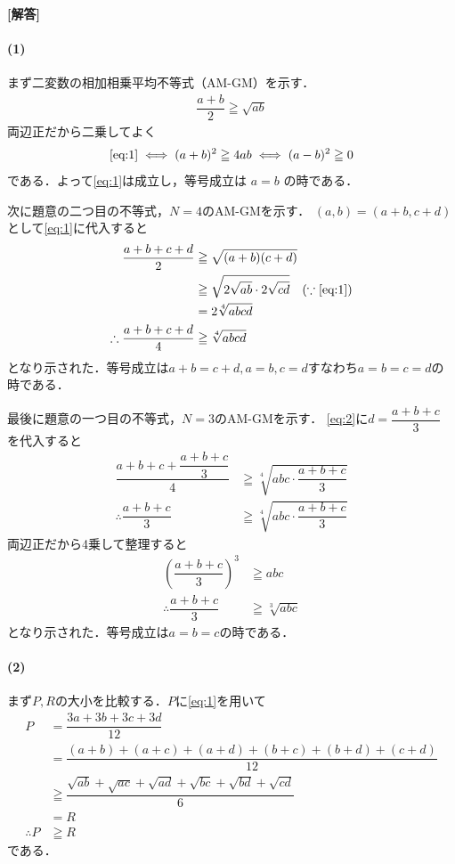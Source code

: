 \documentclass[../../main.tex]{subfiles}
\begin{document}
\begin{oframed}
  
\end{oframed}

{\bf [解答]}
\paragraph{(1)}
まず二変数の相加相乗平均不等式（AM-GM）を示す．
\begin{align}
  \dfrac{a+b}{2} \geqq \sqrt{ab} \label{eq:1}
\end{align}
両辺正だから二乗してよく
\begin{align}
  \text{\cref{eq:1}} \iff (a+b)^2 \geqq 4ab \iff (a-b)^2 \geqq 0
\end{align}
である．よって\cref{eq:1}は成立し，等号成立は $a=b$ の時である．

次に題意の二つ目の不等式，$N=4$のAM-GMを示す．
$(a,b) = (a+b, c+d)$として\cref{eq:1}に代入すると
\begin{align}
  \dfrac{a+b+c+d}{2}
  & \geqq \sqrt{(a+b)(c+d)} \\
  & \geqq \sqrt{2\sqrt{ab}\cdot 2\sqrt{cd}} \quad (\because \text{\cref{eq:1}}) \\
  & = 2 \sqrt[4]{abcd} \\
  \therefore
  \dfrac{a+b+c+d}{4} & \geqq \sqrt[4]{abcd} \label{eq:2}
\end{align}
となり示された．等号成立は$a+b=c+d, a=b, c=d$すなわち$a=b=c=d$の時である．

最後に題意の一つ目の不等式，$N=3$のAM-GMを示す．
\cref{eq:2}に$d = \dfrac{a+b+c}{3}$ を代入すると
\begin{align}
  \dfrac{a+b+c+\dfrac{a+b+c}{3}}{4} & \geqq \sqrt[4]{abc \cdot \dfrac{a+b+c}{3}} \\
  \therefore
  \dfrac{a+b+c}{3} & \geqq \sqrt[4]{abc \cdot \dfrac{a+b+c}{3}}
\end{align}
両辺正だから4乗して整理すると
\begin{align}
  \left(\dfrac{a+b+c}{3}\right)^3 & \geqq abc \\
  \therefore
  \dfrac{a+b+c}{3} & \geqq \sqrt[3]{abc} \label{eq:3}
\end{align}
となり示された．等号成立は$a=b=c$の時である．

\paragraph{(2)}
まず$P, R$の大小を比較する．$P$に\cref{eq:1}を用いて
\begin{align}
  P
  &= \dfrac{3a+3b+3c+3d}{12} \\
  &= \dfrac{(a+b)+(a+c)+(a+d)+(b+c)+(b+d)+(c+d)}{12} \\
  &\geqq \dfrac{\sqrt{ab} + \sqrt{ac} + \sqrt{ad} + \sqrt{bc} + \sqrt{bd} + \sqrt{cd}}{6} \\
  &= R \\
  \therefore
  P & \geqq R \label{eq:4}
\end{align}
である．
\end{document}
